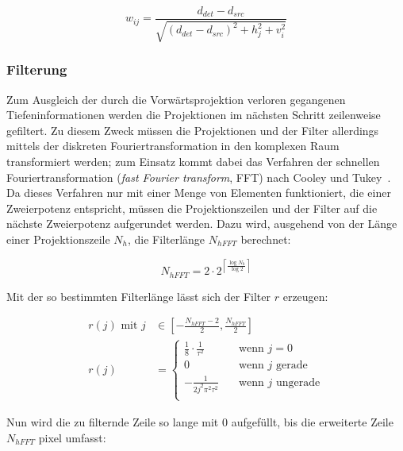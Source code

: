 \begin{equation}
    w_{ij} = \frac{d_{det} - d_{src}}{\sqrt{(d_{det} - d_{src})^2 + h_j^2 + v_i^2}}
\end{equation}

\subsubsection{Filterung}

Zum Ausgleich der durch die Vorwärtsprojektion verloren gegangenen Tiefeninformationen werden die Projektionen im
nächsten Schritt zeilenweise gefiltert. Zu diesem Zweck müssen die Projektionen und der Filter allerdings mittels der
diskreten Fouriertransformation in den komplexen Raum transformiert werden; zum Einsatz kommt dabei das Verfahren der
schnellen Fouriertransformation (\textit{fast Fourier transform}, FFT) nach Cooley und Tukey~\cite{cooltuk}. Da dieses
Verfahren nur mit einer Menge von Elementen funktioniert, die einer Zweierpotenz entspricht, müssen die
Projektionszeilen und der Filter auf die nächste Zweierpotenz {\glqq}aufgerundet{\grqq} werden. Dazu wird, ausgehend von
der Länge einer Projektionszeile $N_h$,  die Filterlänge $N_{hFFT}$ berechnet:

\begin{equation}
    N_{hFFT} = 2 \cdot 2^{\left\lceil \frac{\log N_h}{\log 2} \right\rceil}
\end{equation}

Mit der so bestimmten Filterlänge lässt sich der Filter $r$ erzeugen:

\begin{equation}
    \begin{aligned}
        r(j) \text{ mit } j &\in \left[-\frac{N_{hFFT} - 2}{2}, \frac{N_{hFFT}}{2}\right]\\
        r(j) &=
            \begin{cases}
                \frac{1}{8} \cdot \frac{1}{\tau^2} & \quad \text{wenn } j = 0\\
                0 & \quad \text{wenn } j \text{ gerade}\\
                -\frac{1}{2j^2\pi^2\tau^2} & \quad \text{wenn } j \text{ ungerade}\\
            \end{cases}
    \end{aligned}
\end{equation}

Nun wird die zu filternde Zeile so lange mit $0$ aufgefüllt, bis die erweiterte Zeile $N_{hFFT}$ \gls{pixel} umfasst:

